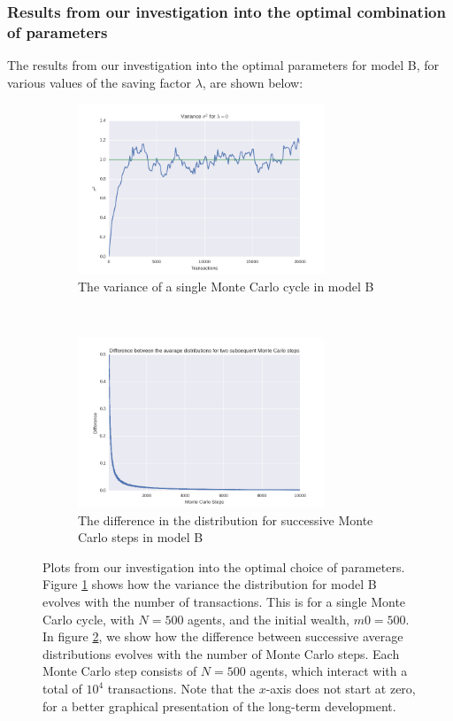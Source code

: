 \documentclass[a4paper, 10pt]{article}
\begin{document}
\subsubsection{Results from our investigation into the optimal combination of parameters}
The results from our investigation into the optimal parameters for model B, for various values of the saving factor $\lambda$,  are shown below:
\begin{figure}[!ht] %
    \centering
    \begin{subfigure}[H!]{0.5\textwidth}
        \centering
        \includegraphics[height=2.0in]{varLamb0.png}
        \caption{The variance of a single Monte Carlo cycle in model B}\label{fig:ModelB_Var}
    \end{subfigure}%
    ~ 
    \begin{subfigure}[H!]{0.5\textwidth}
        \centering
        \includegraphics[height=2.0in]{diffMCLamb0.png}
        \caption{The difference in the distribution for successive Monte Carlo steps in model B}\label{fig:ModelB_MC_steps}
    \end{subfigure}
    \caption{Plots from our investigation into the optimal choice of parameters. Figure \ref{fig:ModelB_Var} shows how the variance the distribution for model B evolves with the number of transactions. This is for a single Monte Carlo cycle, with $N=500$ agents, and the initial wealth, $m0=500$. In figure \ref{fig:ModelB_MC_steps}, we show how the difference between successive average distributions evolves with the number of Monte Carlo steps. Each Monte Carlo step consists of $N=500$ agents, which interact with a total of $10^4$ transactions. Note that the $x$-axis does not start at zero, for a better graphical presentation of the long-term development.}\label{fig:ModelB}
\end{figure} %
\end{document}
